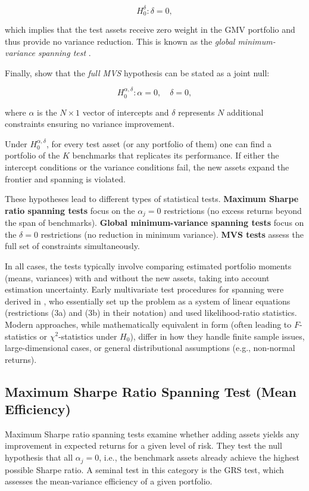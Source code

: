 \[
H_0^\delta : \delta = 0,
\]

which implies that the test assets receive zero weight in the GMV
portfolio and thus provide no variance reduction. This is known as the
\emph{global minimum-variance spanning test} \citep{KanZhou2012}.

Finally, \citet{KanZhou2012} show that the \emph{full MVS} hypothesis can be stated
as a joint null:

\[
H_0^{\alpha,\delta}: \alpha = 0, \quad \delta = 0,
\]

where \(\alpha\) is the \(N\times1\) vector of intercepts and \(\delta\)
represents \(N\) additional constraints ensuring no variance improvement.

Under \(H_0^{\alpha, \delta}\), for every test asset (or any portfolio of
them) one can find a portfolio of the \(K\) benchmarks that replicates its
performance. If either the intercept conditions or the variance
conditions fail, the new assets expand the frontier and spanning is
violated.

These hypotheses lead to different types of statistical tests. \textbf{Maximum
Sharpe ratio spanning tests} focus on the \(\alpha_j = 0\) restrictions
(no excess returns beyond the span of benchmarks). \textbf{Global
minimum-variance spanning tests} focus on the \(\delta = 0\) restrictions
(no reduction in minimum variance). \textbf{MVS tests} assess the full set of
constraints simultaneously.

In all cases, the tests typically involve comparing estimated portfolio
moments (means, variances) with and without the new assets, taking into
account estimation uncertainty. Early multivariate test procedures for
spanning were derived in \citet{HubermanKandel1987}, who essentially set up the
problem as a system of linear equations (restrictions (3a) and (3b) in
their notation) and used likelihood-ratio statistics. Modern approaches,
while mathematically equivalent in form (often leading to \(F\)-statistics
or \(\chi^2\)-statistics under \(H_0\)), differ in how they handle finite
sample issues, large-dimensional cases, or general distributional
assumptions (e.g., non-normal returns).

\subsection{Maximum Sharpe Ratio Spanning Test (Mean Efficiency)}\label{maximum-sharpe-ratio-spanning-test-mean-efficiency}

Maximum Sharpe ratio spanning tests examine whether adding assets yields
any improvement in expected returns for a given level of risk. They test
the null hypothesis that all \(\alpha_j = 0\), i.e., the benchmark assets
already achieve the highest possible Sharpe ratio. A seminal test in
this category is the GRS test, which assesses the mean-variance
efficiency of a given portfolio.

